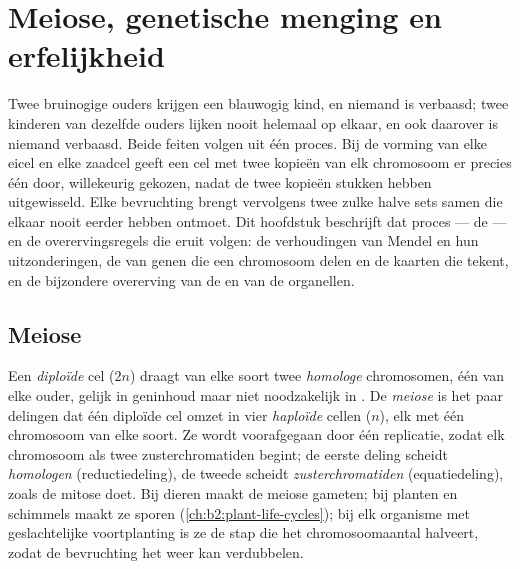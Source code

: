 \chapter{Meiose, genetische menging en erfelijkheid}\label{ch:b2:meiosis-heredity}

Twee bruinogige ouders krijgen een blauwogig kind, en niemand is
verbaasd; twee kinderen van dezelfde ouders lijken nooit helemaal op
elkaar, en ook daarover is niemand verbaasd. Beide feiten volgen uit één
proces. Bij de vorming van elke eicel en elke zaadcel geeft een cel met
twee kopieën van elk chromosoom er precies één door, willekeurig gekozen,
nadat de twee kopieën stukken hebben uitgewisseld. Elke bevruchting
brengt vervolgens twee zulke halve sets samen die elkaar nooit eerder
hebben ontmoet. Dit hoofdstuk beschrijft dat proces --- de  --- en
de overervingsregels die eruit volgen: de verhoudingen van Mendel en hun
uitzonderingen, de  van genen die een chromosoom delen en de
kaarten die  tekent, en de bijzondere overerving van de
 en van de organellen.

\section{Meiose}

\begin{definition}[Meiose]\label{def:b2:meiosis-heredity:meiosis}
Een \emph{diploïde} cel ($2n$) draagt van elke soort twee
\emph{homologe} chromosomen, één van elke ouder, gelijk in geninhoud maar
niet noodzakelijk in . De \emph{meiose} is het paar delingen dat
één diploïde cel omzet in vier \emph{haploïde} cellen ($n$), elk met één
chromosoom van elke soort. Ze wordt voorafgegaan door één replicatie,
zodat elk chromosoom als twee zusterchromatiden begint; de eerste deling
scheidt \emph{homologen} (reductiedeling), de tweede scheidt
\emph{zusterchromatiden} (equatiedeling), zoals de mitose doet. Bij
dieren maakt de meiose gameten; bij planten en schimmels maakt ze sporen
(\cref{ch:b2:plant-life-cycles}); bij elk organisme met geslachtelijke
voortplanting is ze de stap die het chromosoomaantal halveert, zodat de
bevruchting het weer kan verdubbelen.
\end{definition}


